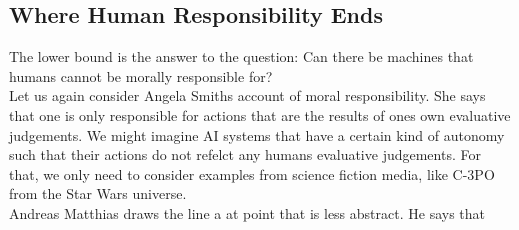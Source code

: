 \documentclass{article}
\newcounter{example}
\begin{document}
%
%
%
%
%


\subsection{Where Human Responsibility Ends}

The lower bound is the answer to the question: Can there be machines that humans
cannot be morally responsible for?\\
Let us again consider Angela Smiths account of moral responsibility. She says that one is
only responsible for actions that are the results of ones own evaluative
judgements. We might imagine AI systems that have a certain kind of autonomy such
that their actions do not refelct any humans evaluative judgements. For that, we
only need to consider examples from science fiction media, like C-3PO from the Star
Wars universe.\\

Andreas Matthias draws the line a at point that is less abstract. He says that\\
\end{document}
